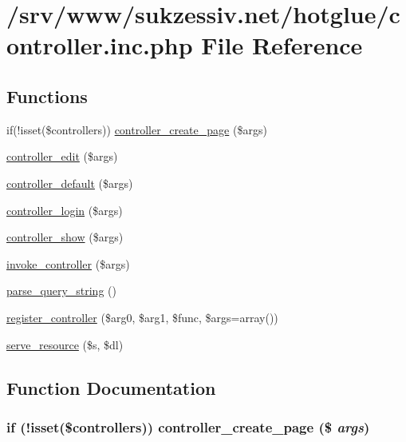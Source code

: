 \hypertarget{controller_8inc_8php}{
\section{/srv/www/sukzessiv.net/hotglue/controller.inc.php File Reference}
\label{controller_8inc_8php}
}
\subsection*{Functions}
\begin{CompactItemize}
\item 
if(!isset(\$controllers)) \hyperlink{controller_8inc_8php_647d96ea8304771250e8fa4251a4d12e}{controller\_\-create\_\-page} (\$args)
\item 
\hyperlink{controller_8inc_8php_406fb5b2a2a93bef89e4ba46f8829d2f}{controller\_\-edit} (\$args)
\item 
\hyperlink{controller_8inc_8php_e9c67435a37f4b70d0769079c9dbf379}{controller\_\-default} (\$args)
\item 
\hyperlink{controller_8inc_8php_c3e283e26869e2ffd938bdf9775c3e81}{controller\_\-login} (\$args)
\item 
\hyperlink{controller_8inc_8php_d135971740244b9e81718d4cd0407b11}{controller\_\-show} (\$args)
\item 
\hyperlink{controller_8inc_8php_170bef82dc4636c51b678276323e4ff4}{invoke\_\-controller} (\$args)
\item 
\hyperlink{controller_8inc_8php_51a50fbc5165b4ff0a289b2010bb7597}{parse\_\-query\_\-string} ()
\item 
\hyperlink{controller_8inc_8php_543961dbcd309fa2cb6a887a8666bf1c}{register\_\-controller} (\$arg0, \$arg1, \$func, \$args=array())
\item 
\hyperlink{controller_8inc_8php_5d5274c3531eb05a1ea5927ff3cd08d3}{serve\_\-resource} (\$s, \$dl)
\end{CompactItemize}


\subsection{Function Documentation}
\hypertarget{controller_8inc_8php_647d96ea8304771250e8fa4251a4d12e}{
\subsubsection[{controller\_\-create\_\-page}]{\setlength{\rightskip}{0pt plus 5cm}if (!isset(\$controllers)) controller\_\-create\_\-page (\$ {\em args})}}
\label{controller_8inc_8php_647d96ea8304771250e8fa4251a4d12e}


